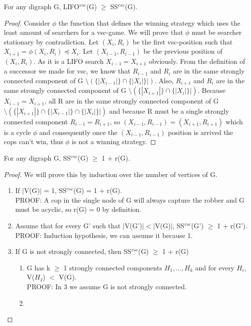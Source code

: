 \begin{lemma}
For any digraph G, LIFO$^{vsc}$(G) $\geq$ SS$^{vsc}$(G).
\end{lemma}
\begin{proof}
Consider $\phi$ the function that defines the winning strategy which uses the least amount of searchers for a vsc-game. We will prove that $\phi$ must be searcher stationary by contradiction. 
Let $(X_i, R_i)$ be the first vsc-position such that $X_{i+1} = \phi (X_i, R_i) \preceq X_i$. Let $(X_{i-1}, R_{i-1})$ be the previous position of $(X_i, R_i)$. As it is a LIFO search  $X_{i-1} = X_{i+1}$ obviously. From the definition of a successor we made for vsc, we know that  $R_{i-1}$ and $R_i$ are in the same strongly connected component of G $\setminus (\{|X_{i-1}|\} \cap \{|X_i|\}|)$. Also, $R_{i+1}$ and $R_i$ are in the same strongly connected component of G $\setminus (\{|X_{i+1}|\} \cap \{|X_i|\}|)$. Because $X_{i-1} = X_{i+1}$, all R are in the same strongly connected component of G $\setminus (\{|X_{i+1}|\} \cap \{|X_{i-1}|\} \cap \{|X_i|\}|)$ and because R must be a single strongly connected component $R_{i-1} = R_{i+1}$, so $(X_{i-1}, R_{i-1}) = (X_{i+1}, R_{i+1})$ which is a cycle $\phi$ and consequently once the $(X_{i-1}, R_{i-1})$ position is arrived the cops can't win, thus $\phi$ is not a winning strategy.
\end{proof}
\begin{lemma}
For any digraph G, SS$^{vsc}$(G) $\geq$ 1 + r(G).
\end{lemma}
\begin{proof}
We will prove this by induction over the number of vertices of G.
\begin{enumerate}
  \item If $|$V(G)$|$ = 1, SS$^{vsc}$(G) = 1 + r(G). \\
  PROOF: A cop in the single node of G will always capture the robber and G must be acyclic, so r(G) = 0 by definition.
  \item Assume that for every G' such that  $|$V(G')$| < |$V(G)$|$, SS$^{vsc}$(G') $\geq$ 1 + r(G'). \\
  PROOF: Induction hypothesis, we can assume it because 1.
  \item If G is not strongly connected, then SS$^{vsc}$(G) $\geq$ 1 + r(G)
  \begin{enumerate}[label*=\arabic*.]
    \item G has k $\geq$ 1 strongly connected components $H_1, \ldots, H_k$ and for every $H_i$, V($H_I$) $<$ V(G). \\
    PROOF: In 3 we assume G is not strongly connected.
    \item 
  \end{enumerate}
\end{enumerate}
\end{proof}